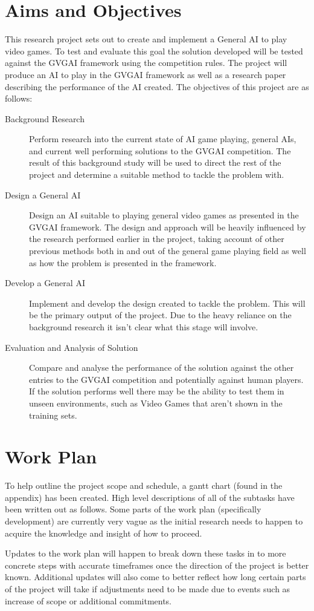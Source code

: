 \documentclass[a4paper]{article}
\begin{document}
\section{Aims and Objectives}
This research project sets out to create and implement a General AI to play video games.
To test and evaluate this goal the solution developed will be tested against the GVGAI framework using the competition rules.\cite{GVGAI2014}
The project will produce an AI to play in the GVGAI framework as well as a research paper describing the performance of the AI created.
The objectives of this project are as follows:
\begin{description}
    \item [Background Research]
    Perform research into the current state of AI game playing, general AIs, and current well performing solutions to the GVGAI competition.
    The result of this background study will be used to direct the rest of the project and determine a suitable method to tackle the problem with.

    \item [Design a General AI]
    Design an AI suitable to playing general video games as presented in the GVGAI framework.
    The design and approach will be heavily influenced by the research performed earlier in the project, taking account of other previous methods both in and out of the general game playing field as well as how the problem is presented in the framework.

    \item [Develop a General AI]
    Implement and develop the design created to tackle the problem.
    This will be the primary output of the project.
    Due to the heavy reliance on the background research it isn't clear what this stage will involve.

    \item [Evaluation and Analysis of Solution]
    Compare and analyse the performance of the solution against the other entries to the GVGAI competition and potentially against human players.
    If the solution performs well there may be the ability to test them in unseen environments, such as Video Games that aren't shown in the training sets.
\end{description}

\section{Work Plan}
To help outline the project scope and schedule, a gantt chart (found in the appendix) has been created.
High level descriptions of all of the subtasks have been written out as follows.
Some parts of the work plan (specifically development) are currently very vague as the initial research needs to happen to acquire the knowledge and insight of how to proceed.
\par
Updates to the work plan will happen to break down these tasks in to more concrete steps with accurate timeframes once the direction of the project is better known.
Additional updates will also come to better reflect how long certain parts of the project will take if adjustments need to be made due to events such as increase of scope or additional commitments.
\end{document}
